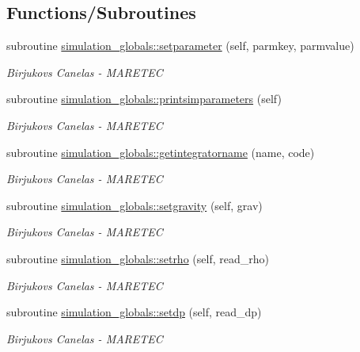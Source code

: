 \subsection*{Functions/\+Subroutines}
\begin{DoxyCompactItemize}
\item 
subroutine \mbox{\hyperlink{namespacesimulation__globals_aed3f671899558008ae9f0f009f581baf}{simulation\+\_\+globals\+::setparameter}} (self, parmkey, parmvalue)
\begin{DoxyCompactList}\small\item\em Birjukovs Canelas -\/ M\+A\+R\+E\+T\+EC \end{DoxyCompactList}\item 
subroutine \mbox{\hyperlink{namespacesimulation__globals_a0b17b2f2e9e7dbbad7c9d735217c1ee1}{simulation\+\_\+globals\+::printsimparameters}} (self)
\begin{DoxyCompactList}\small\item\em Birjukovs Canelas -\/ M\+A\+R\+E\+T\+EC \end{DoxyCompactList}\item 
subroutine \mbox{\hyperlink{namespacesimulation__globals_a2c6bf88542c503d1da58280ab3dcf772}{simulation\+\_\+globals\+::getintegratorname}} (name, code)
\begin{DoxyCompactList}\small\item\em Birjukovs Canelas -\/ M\+A\+R\+E\+T\+EC \end{DoxyCompactList}\item 
subroutine \mbox{\hyperlink{namespacesimulation__globals_ac655f60155581a71b312f3c1a8c87db2}{simulation\+\_\+globals\+::setgravity}} (self, grav)
\begin{DoxyCompactList}\small\item\em Birjukovs Canelas -\/ M\+A\+R\+E\+T\+EC \end{DoxyCompactList}\item 
subroutine \mbox{\hyperlink{namespacesimulation__globals_acfdc640757f0275bccb1d8de7bd7dc92}{simulation\+\_\+globals\+::setrho}} (self, read\+\_\+rho)
\begin{DoxyCompactList}\small\item\em Birjukovs Canelas -\/ M\+A\+R\+E\+T\+EC \end{DoxyCompactList}\item 
subroutine \mbox{\hyperlink{namespacesimulation__globals_a9a8e88c06937b7cf6be9d9bf30f54ba9}{simulation\+\_\+globals\+::setdp}} (self, read\+\_\+dp)
\begin{DoxyCompactList}\small\item\em Birjukovs Canelas -\/ M\+A\+R\+E\+T\+EC \end{DoxyCompactList}\item 

\end{DoxyCompactItemize}
